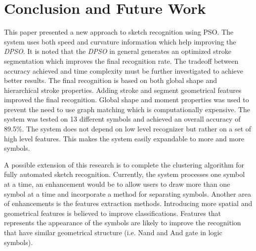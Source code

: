 \documentclass{article}
\begin{document}
\section{Conclusion and Future Work}
\label{ConclusionandFutureWork}
This paper presented a new approach to sketch recognition using PSO. The system uses both speed and curvature information which help improving the \textit{DPSO}. It is noted that the \textit{DPSO} in general generates an optimized stroke segmentation which improves the final recognition rate.  The tradeoff between accuracy achieved and time complexity must be further investigated to achieve better results. The final recognition is based on both global shape and hierarchical stroke properties. Adding stroke and segment geometrical features improved the final recognition. Global shape and moment properties was used to prevent the need to use graph matching which is computationally expensive. The system was tested on 13 different symbols and achieved an overall accuracy of 89.5\%. The system does not depend on low level recognizer but rather on a set of high level features. This makes the system easily expandable to more and more symbols. 

 A possible extension of this research is to complete the clustering algorithm for fully automated sketch recognition. Currently, the system processes one symbol at a time, an enhancement would be to allow users to draw more than one symbol at a time and incorporate a method for separating symbols. Another area of enhancements is the features extraction methods. Introducing more spatial and geometrical features is believed to improve classifications. Features that represents the appearance of the symbols are likely to improve the recognition that have similar geometrical structure (i.e. Nand and And gate in logic symbols).   


\end{document}
